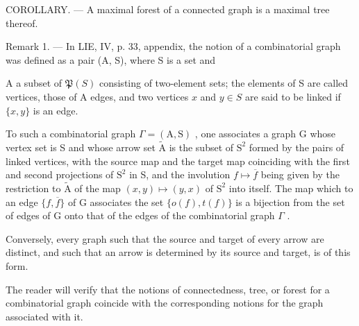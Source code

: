 COROLLARY. --- A maximal forest of a connected graph is a maximal tree thereof.

Remark 1. --- In LIE, IV, p. 33, appendix, the notion of a combinatorial graph was defined as a pair (A, S), where S is a set and

A a subset of \(\mathfrak{P}(S)\) consisting of two-element sets; the elements of S are called vertices, those of A edges, and two vertices \(x\) and \(y \in S\) are said to be linked if \(\{x, y\}\) is an edge.

To such a combinatorial graph \(\Gamma = (\mathrm{A},\mathrm{S})\) , one associates a graph G whose vertex set is S and whose arrow set \(\widetilde{\mathrm{A}}\) is the subset of \(\mathrm{S}^2\) formed by the pairs of linked vertices, with the source map and the target map coinciding with the first and second projections of \(\mathrm{S}^2\) in S, and the involution \(f\mapsto \overline{f}\) being given by the restriction to \(\widetilde{\mathrm{A}}\) of the map \((x,y)\mapsto (y,x)\) of \(\mathrm{S}^2\) into itself. The map which to an edge \(\{f,\overline{f}\}\) of G associates the set \(\{o(f),t(f)\}\) is a bijection from the set of edges of G onto that of the edges of the combinatorial graph \(\Gamma\) .

Conversely, every graph such that the source and target of every arrow are distinct, and such that an arrow is determined by its source and target, is of this form.

The reader will verify that the notions of connectedness, tree, or forest for a combinatorial graph coincide with the corresponding notions for the graph associated with it.

